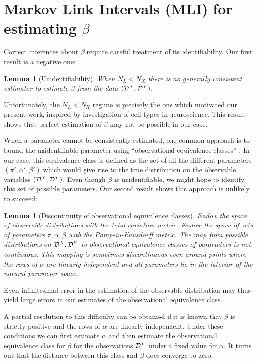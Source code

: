 \documentclass{article}
\newtheorem{lemma}[thm]{Lemma}
\theoremstyle{definition}
\begin{document}
\section{Markov Link Intervals (MLI) for estimating $\beta$}

Correct inferences about $\beta$ require careful treatment of its identifiability.  Our first result is a negative one:

\begin{lemma}[Unidentifiability]  \label{lem:unident} When $N_L<N_X$ there is no generally consistent estimator to estimate $\beta$ from the data $(\mathcal{D}^X,\mathcal{D}^Y)$.  
\end{lemma}

Unfortunately, the $N_L<N_X$ regime is precisely the one which motivated our present work, inspired by investigation of cell-types in neuroscience.  This result shows that perfect estimation of $\beta$ may not be possible in our case.

When a parameter cannot be consistently estimated, one common approach is to bound the unidentifiable parameter using  ``observational equivalence classes'' \cite{paulino1994identifiability,hauser2012characterization,tong1991indeterminacy}.  In our case, this equivalence class is defined as the set of all the different parameters $(\pi',\alpha',\beta')$ which would give rise to the true distribution on the observable variables $(\mathcal{D}^X,\mathcal{D}^Y)$.  Even though $\beta$ is unidentifiable, we might hope to identify this set of possible parameters.  Our second result shows this approach is unlikely to succeed:

\begin{lemma}[Discontinuity of observational equivalence classes]  \label{lem:noobseq} Endow the space of observable distributions with the total variation metric.  Endow the space of sets of parameters $\pi,\alpha,\beta$ with the Pompeiu-Hausdorff metric.  The map from possible distributions on $\mathcal{D}^X,\mathcal{D}^Y$ to observational equivalence classes of parameters is not continuous.   This mapping is sometimes discontinuous even around points where the rows of $\alpha$ are linearly independent and all parameters lie in the interior of the natural parameter space.  
\end{lemma}

Even infinitesimal error in the estimation of the observable distribution may thus yield large errors in our estimates of the observational equivalence class.

A partial resolution to this difficulty can be obtained if it is known that $\beta$ is strictly positive and the rows of $\alpha$ are linearly independent.  Under these conditions we can first estimate $\alpha$ and then estimate the observational equivalence class for $\beta$ for the observations $\mathcal{D}^Y$ under a fixed value for $\alpha$.  It turns out that the distance between this class and $\beta$ does converge to zero:
\end{document}
